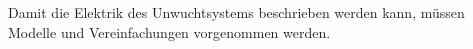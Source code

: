 
\label{Einleitung}

Damit die Elektrik des Unwuchtsystems beschrieben werden kann, müssen Modelle und Vereinfachungen vorgenommen werden. 